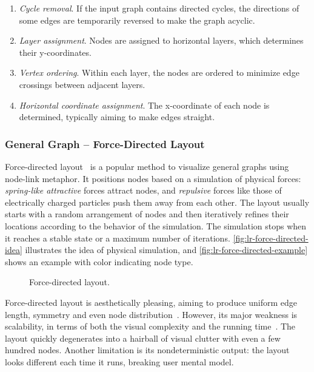 \begin{enumerate}
	\item \emph{Cycle removal}. If the input graph contains directed cycles, the directions of some edges are temporarily reversed to make the graph acyclic.
	\item \emph{Layer assignment}. Nodes are assigned to horizontal layers, which determines their y-coordinates.
	\item \emph{Vertex ordering}. Within each layer, the nodes are ordered to minimize edge crossings between adjacent layers.
	\item \emph{Horizontal coordinate assignment}. The x-coordinate of each node is determined, typically aiming to make edges straight.
\end{enumerate}

\subsubsection{General Graph -- Force-Directed Layout}
Force-directed layout~\cite{Eades1984} is a popular method to visualize general graphs using node-link metaphor. It positions nodes based on a simulation of physical forces: \emph{spring-like attractive} forces attract nodes, and \emph{repulsive} forces like those of electrically charged particles push them away from each other. The layout usually starts with a random arrangement of nodes and then iteratively refines their locations according to the behavior of the simulation. The simulation stops when it reaches a stable state or a maximum number of iterations. \autoref{fig:lr-force-directed-idea} illustrates the idea of physical simulation, and \autoref{fig:lr-force-directed-example} shows an example with color indicating node type.

\begin{figure}[!htb]
\centering
{}
\hfill
{}
\caption{Force-directed layout.}
\end{figure}

Force-directed layout is aesthetically pleasing, aiming to produce uniform edge length, symmetry and even node distribution~\cite{Fruchterman1991}. However, its major weakness is scalability, in terms of both the visual complexity and the running time~\cite{Munzner2014}. The layout quickly degenerates into a hairball of visual clutter with even a few hundred nodes. Another limitation is its nondeterministic output: the layout looks different each time it runs, breaking user mental model.

